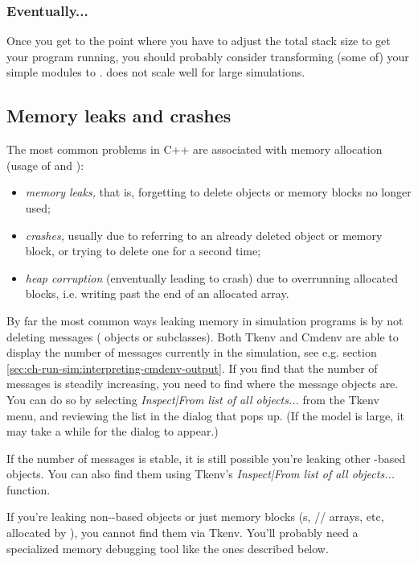 \subsubsection{Eventually...}

Once you get to the point where you have to adjust the total stack size
to get your program running,
you should probably consider transforming (some of) your 
simple modules to .  does not
scale well for large simulations.



\subsection{Memory leaks and crashes}

The most common problems in C++ are associated with memory allocation
(usage of  and ):

\begin{itemize}
   \item{\textit{memory leaks,} that is, forgetting to delete objects
     or memory blocks no longer used;}
   \item{\textit{crashes,} usually due to referring to an already deleted
     object or memory block, or trying to delete one for a second time;}
   \item{\textit{heap corruption} (enventually leading to crash) due to
     overrunning allocated blocks, i.e. writing past the end of an allocated
     array.}
\end{itemize}

By far the most common ways leaking memory in simulation programs
is by not deleting messages ( objects or subclasses).
Both Tkenv and Cmdenv are able to display the number of messages
currently in the simulation,
see e.g. section \ref{sec:ch-run-sim:interpreting-cmdenv-output}.
If you find that the number of messages is steadily increasing,
you need to find where the message objects are. You can do so
by selecting \textit{Inspect|From list of all objects...} from
the Tkenv menu, and reviewing the list in the dialog that pops up.
(If the model is large, it may take a while for the dialog to appear.)

If the number of messages is stable, it is still possible
you're leaking other -based objects. You can
also find them using Tkenv's \textit{Inspect|From list of all objects...}
function.

If you're leaking non--based objects or just
memory blocks (s, // arrays,
etc, allocated by ), you cannot find them via Tkenv.
You'll probably need a specialized memory debugging tool like
the ones described below.


